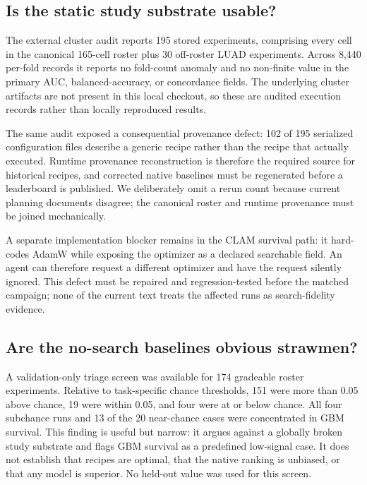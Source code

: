 \documentclass{article}
\begin{document}
\subsection{Is the static study substrate usable?}

The external cluster audit reports 195 stored experiments, comprising every
cell in the canonical 165-cell roster plus 30 off-roster LUAD experiments.
Across 8,440 per-fold records it reports no fold-count anomaly and no non-finite
value in the primary AUC, balanced-accuracy, or concordance fields.  The
underlying cluster artifacts are not present in this local checkout, so these
are audited execution records rather than locally reproduced results.

The same audit exposed a consequential provenance defect: 102 of 195 serialized
configuration files describe a generic recipe rather than the recipe that
actually executed.  Runtime provenance reconstruction is therefore the
required source for historical recipes, and corrected native baselines must be
regenerated before a leaderboard is published.  We deliberately omit a rerun
count because current planning documents disagree; the canonical roster and
runtime provenance must be joined mechanically.

A separate implementation blocker remains in the CLAM survival path: it
hard-codes AdamW while exposing the optimizer as a declared searchable field.
An agent can therefore request a different optimizer and have the request
silently ignored.  This defect must be repaired and regression-tested before
the matched campaign; none of the current text treats the affected runs as
search-fidelity evidence.

\subsection{Are the no-search baselines obvious strawmen?}

A validation-only triage screen was available for 174 gradeable roster
experiments.  Relative to task-specific chance thresholds, 151 were more than
0.05 above chance, 19 were within 0.05, and four were at or below chance.  All
four subchance runs and 13 of the 20 near-chance cases were concentrated in GBM
survival.  This finding is useful but narrow: it argues against a globally
broken study substrate and flags GBM survival as a predefined low-signal case.
It does not establish that recipes are optimal, that the native ranking is
unbiased, or that any model is superior.  No held-out value was used for this
screen.
\end{document}
